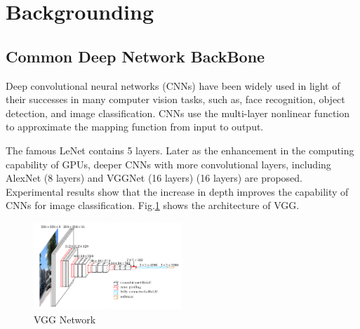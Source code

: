 \section{Backgrounding}


\subsection{Common Deep Network BackBone}
Deep convolutional neural networks (CNNs) \cite{Lecun2014Backpropagation} have been widely used in light of their successes in many computer vision tasks, such as, face recognition\cite{Schroff2015FaceNet},  object detection\cite{Ren2015Faster}, and image classification\cite{Krizhevsky2012ImageNet}. CNNs use the multi-layer nonlinear function to approximate the mapping function from input to output.

The famous LeNet contains 5 layers. Later as the enhancement in the computing capability of GPUs, deeper CNNs with more convolutional layers, including AlexNet (8 layers) \cite{Krizhevsky2012ImageNet} and VGGNet (16 layers) (16 layers)\cite{Simonyan-VGG} are proposed. Experimental results show that the increase in depth improves the capability of CNNs for image classification. Fig.\ref{VGG} shows the architecture of VGG.

\begin{figure}[ht]
    \centering
    \includegraphics[width=0.5\textwidth]{./figure/VGG.png}
    \caption{VGG Network}
    \label{VGG}
\end{figure}

